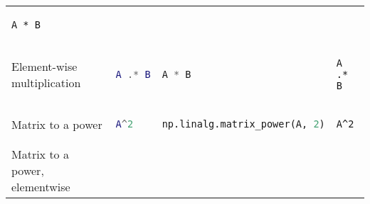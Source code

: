 \documentclass[]{article}
\begin{document}
\begin{longtable}[]{@{}llll@{}}
\begin{minipage}[t]{0.20\columnwidth}
\begin{lstlisting}
A * B
\end{lstlisting}
\strut
\end{minipage}\tabularnewline
\begin{minipage}[t]{0.23\columnwidth}\raggedright\strut
Element-wise multiplication\strut
\end{minipage} & \begin{minipage}[t]{0.22\columnwidth}\raggedright\strut
\begin{lstlisting}[language=Matlab]
A .* B
\end{lstlisting}
\strut
\end{minipage} & \begin{minipage}[t]{0.23\columnwidth}\raggedright\strut
\begin{lstlisting}[language=Python]
A * B
\end{lstlisting}
\strut
\end{minipage} & \begin{minipage}[t]{0.20\columnwidth}\raggedright\strut
\begin{lstlisting}
A .* B
\end{lstlisting}
\strut
\end{minipage}\tabularnewline
\begin{minipage}[t]{0.23\columnwidth}\raggedright\strut
Matrix to a power\strut
\end{minipage} & \begin{minipage}[t]{0.22\columnwidth}\raggedright\strut
\begin{lstlisting}[language=Matlab]
A^2
\end{lstlisting}
\strut
\end{minipage} & \begin{minipage}[t]{0.23\columnwidth}\raggedright\strut
\begin{lstlisting}[language=Python]
np.linalg.matrix_power(A, 2)
\end{lstlisting}
\strut
\end{minipage} & \begin{minipage}[t]{0.20\columnwidth}\raggedright\strut
\begin{lstlisting}
A^2
\end{lstlisting}
\strut
\end{minipage}\tabularnewline
\begin{minipage}[t]{0.23\columnwidth}\raggedright\strut
Matrix to a power, elementwise\strut
\end{minipage} & \begin{minipage}[t]{0.22\columnwidth}\raggedright\strut

\end{minipage}
\end{longtable}
\end{document}
